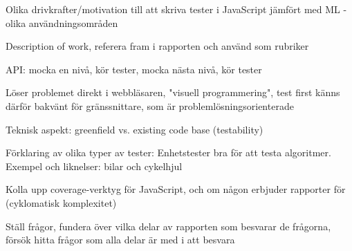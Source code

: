 \documentclass[11pt]{article}
\begin{document}
Olika drivkrafter/motivation till att skriva tester i JavaScript jämfört med ML - olika användningsområden

Description of work, referera fram i rapporten och använd som rubriker

API: mocka en nivå, kör tester, mocka nästa nivå, kör tester

Löser problemet direkt i webbläsaren, "visuell programmering", test first känns därför bakvänt för gränssnittare, som är problemlösningsorienterade

Teknisk aspekt: greenfield vs. existing code base (testability)

Förklaring av olika typer av tester: Enhetstester bra för att testa algoritmer. Exempel och liknelser: bilar och cykelhjul

Kolla upp coverage-verktyg för JavaScript, och om någon erbjuder rapporter för (cyklomatisk komplexitet)

Ställ frågor, fundera över vilka delar av rapporten som besvarar de frågorna, försök hitta frågor som alla delar är med i att besvara

\printbibliography
\end{document}
